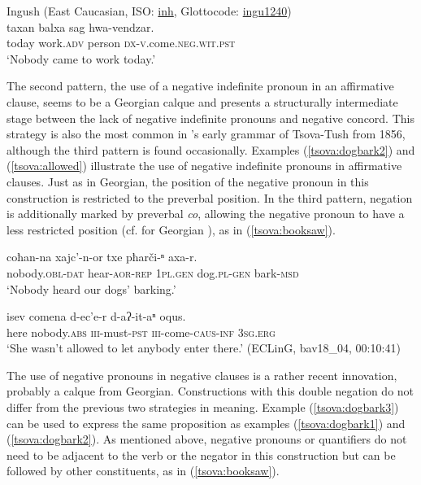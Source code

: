 \documentclass[output=paper,%
colorlinks,citecolor=brown,
showindex
]{langscibook}
\begin{document}
\ea	\label{tsova:work} Ingush (East Caucasian, ISO: \href{https://iso639-3.sil.org/code/inh}{inh}, Glottocode: \href{https://glottolog.org/resource/languoid/id/ingu1240}{ingu1240})\\
\gll 	taxan balxa sag hwa-vendzar.\\  
	today work.\textsc{adv} person  \textsc{dx-v}.come.\textsc{neg.wit.pst}\\
\glt `Nobody came to work today.' \citep[696]{Nichols2011} 
\z

The second pattern, the use of a negative indefinite pronoun in an affirmative clause, seems to be a Georgian calque and presents a structurally intermediate stage between the lack of negative indefinite pronouns and negative concord. This strategy is also the most common in \citeauthor{Schiefner1856}'s early grammar of Tsova-Tush from 1856, although the third pattern is found occasionally. Examples (\ref{tsova:dogbark2}) and  (\ref{tsova:allowed}) illustrate the use of negative indefinite pronouns in affirmative clauses. Just as in Georgian, the position of the negative pronoun in this construction is restricted to the preverbal position. In the third pattern, negation is additionally marked by preverbal \textit{co}, allowing the negative pronoun to have a less restricted position (cf. for Georgian \citealt{HollowayKing1996}), as in (\ref{tsova:booksaw}).


\ea	\label{tsova:dogbark2}
\gll 	coħan-na xajc’-n-or	txe	pħarči-ⁿ	axa-r.\\  
	nobody.\textsc{obl-dat} hear-\textsc{aor-rep} \textsc{1pl.gen} dog.\textsc{pl-gen} bark-\textsc{msd}\\
\glt `Nobody heard our dogs’ barking.' \citep[202]{Mikeladze2011} 
\z

\ea	\label{tsova:allowed}
\gll 	isev comena d-ec'e-r d-aʔ-it-aⁿ oqus.\\  
	here nobody.\textsc{abs} \textsc{iii}-must-\textsc{pst} \textsc{iii}-come-\textsc{caus}-\textsc{inf} \textsc{3sg.erg}\\
\glt `She wasn't allowed to let anybody enter there.' (ECLinG, bav18\_04, 00:10:41)
\z

The use of negative pronouns in negative clauses is a rather recent innovation, probably a calque from Georgian. Constructions with this double negation do not differ from the previous two strategies in meaning. Example (\ref{tsova:dogbark3}) can be used to express the same proposition as examples (\ref{tsova:dogbark1}) and (\ref{tsova:dogbark2}). As mentioned above, negative pronouns or quantifiers do not need to be adjacent to the verb or the negator in this construction but can be followed by other constituents, as in (\ref{tsova:booksaw}). 
\end{document}
